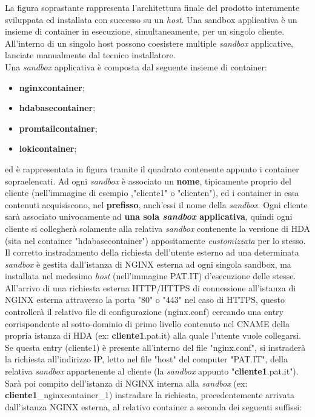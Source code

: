 La figura soprastante rappresenta l'architettura finale del prodotto interamente sviluppata ed installata con successo su un \textit{host}. 
Una sandbox applicativa è un insieme di container in esecuzione, simultaneamente, per un singolo cliente. All'interno di un singolo host possono coesistere multiple \textit{sandbox} applicative, lanciate manualmente dal tecnico installatore.\\
Una \textit{sandbox} applicativa è composta dal seguente insieme di container:
\begin{itemize}
	\item \textbf{nginxcontainer};
	\item \textbf{hdabasecontainer};
	\item \textbf{promtailcontainer};
	\item \textbf{lokicontainer};
\end{itemize}
ed è rappresentata in figura tramite il quadrato contenente appunto i container sopraelencati. Ad ogni \textit{sandbox} è associato un \textbf{nome}, tipicamente proprio del cliente (nell'immagine di esempio ,"cliente1" o "clienten"), ed i container in essa contenuti acquisiscono, nel \textbf{prefisso}, anch'essi il nome della \textit{sandbox}. Ogni cliente sarà associato univocamente ad \textbf{una sola \textit{sandbox} applicativa}, quindi ogni cliente si collegherà solamente alla relativa \textit{sandbox} contenente la versione di HDA (sita nel container "hdabasecontainer") appositamente \textit{customizzata} per lo stesso.
Il corretto instradamento della richiesta dell'utente esterno ad una determinata \textit{sandbox} è gestita dall'istanza di NGINX esterna ad ogni singola sandbox, ma installata nel medesimo \textit{host} (nell'immagine PAT.IT) d'esecuzione delle stesse. All'arrivo di una richiesta esterna HTTP/HTTPS di connessione all'istanza di NGINX esterna attraverso la porta "80" o "443" nel caso di HTTPS, questo controllerà il relativo file di configurazione (nginx.conf) cercando una entry corrispondente al sotto-dominio di primo livello contenuto nel \gls{CNAME} della propria istanza di HDA (ex: \textbf{cliente1}.pat.it) alla quale l'utente vuole collegarsi. Se questa entry (cliente1) è presente all'interno del file "nginx.conf", si instraderà la richiesta all'indirizzo IP, letto nel file "host" del computer "PAT.IT", della relativa \textit{sandbox} appartenente al cliente (la \textit{sandbox} appunto "\textbf{cliente1}.pat.it"). Sarà poi compito dell'istanza di NGINX interna alla \textit{sandbox} (ex: \textbf{cliente1}\_nginxcontainer\_1) instradare la richiesta, precedentemente arrivata dall'istanza NGINX esterna, al relativo container a seconda dei seguenti suffissi:
